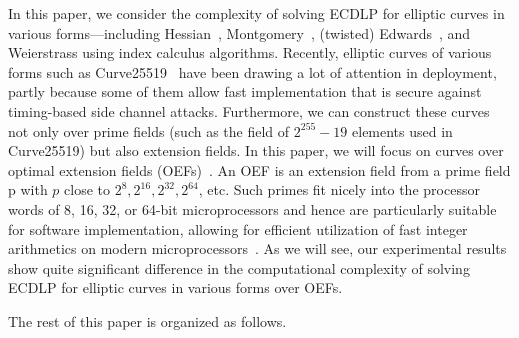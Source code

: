 In this paper, we consider the complexity of solving ECDLP for
elliptic curves in various forms---including
Hessian~\cite{DBLP:conf/ches/Smart01},
Montgomery~\cite{1987-montgomery}, (twisted)
Edwards~\cite{DBLP:journals/iacr/BernsteinL07,DBLP:journals/iacr/BernsteinBJLP08},
and Weierstrass using index calculus algorithms.
%
Recently, elliptic curves of various forms such as
Curve25519~\cite{DBLP:conf/pkc/Bernstein06} have been drawing a lot of
attention in deployment, partly because some of them allow fast
implementation that is secure against timing-based side channel
attacks.
%
Furthermore, we can construct these curves not only over prime fields
(such as the field of $2^{255} - 19$ elements used in Curve25519) but
also extension fields.
%
In this paper, we will focus on curves over optimal extension fields
(OEFs)~\cite{DBLP:conf/crypto/BaileyP98}.
%
An OEF is an extension field from a prime field \F p with $p$ close to
$2^8, 2^{16}, 2^{32}, 2^{64}$, etc.
%
Such primes fit nicely into the processor words of 8, 16, 32, or
64-bit microprocessors and hence are particularly suitable for
software implementation, allowing for efficient utilization of fast
integer arithmetics on modern
microprocessors~\cite{DBLP:conf/crypto/BaileyP98}.
%
As we will see, our experimental results show quite significant
difference in the computational complexity of solving ECDLP for
elliptic curves in various forms over OEFs.

The rest of this paper is organized as follows.
%
